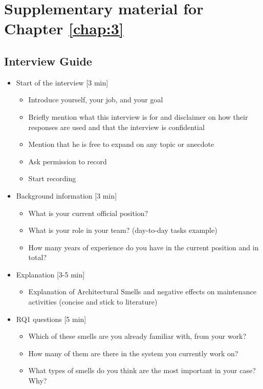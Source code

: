 \chapter{Supplementary material for Chapter \ref{chap:3}}
\label{c3:appendix}
\section{Interview Guide}
\begin{itemize}
    \item Start of the interview [3 min]
    \begin{itemize}
        \item Introduce yourself, your job, and your goal
        \item Briefly mention what this interview is for and disclaimer on how their responses are used and that the interview is confidential
        \item Mention that he is free to expand on any topic or anecdote
        \item Ask permission to record 
        \item Start recording
    \end{itemize}

    \item Background information [3 min]
    \begin{itemize}
        \item What is your current official position? 
        \item What is your role in your team? (day-to-day tasks example) 
        \item How many years of experience do you have in the current position and in total? 
    \end{itemize}

    \item Explanation [3-5 min]
    \begin{itemize}
        \item Explanation of Architectural Smells and negative effects on maintenance activities (concise and stick to literature) 
    \end{itemize}

    \item RQ1 questions [5 min]
    \begin{itemize}
        \item Which of these smells are you already familiar with, from your work? 
        \item How many of them are there in the system you currently work on?
        \item What types of smells do you think are the most important in your case? Why? 
    \end{itemize}


\end{itemize}
